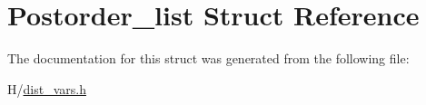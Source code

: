 \hypertarget{structPostorder__list}{
\section{Postorder\_\-list Struct Reference}
\label{structPostorder__list}
}


The documentation for this struct was generated from the following file:\begin{DoxyCompactItemize}
\item 
H/\hyperlink{dist__vars_8h}{dist\_\-vars.h}\end{DoxyCompactItemize}
